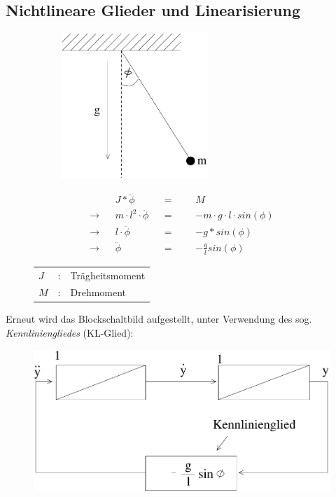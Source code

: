 \message{ !name(Mitschrieb_SysRegel.tex)}\documentclass[12pt,a4paper,ngerman]{scrartcl}
\begin{document}
\subsection{Nichtlineare Glieder und Linearisierung}

\begin{figure}[H]
  \begin{minipage}{.4\linewidth} %
\begin{figure}[H]
\includegraphics[height=5.5cm]{sysregel_bsp_6} %
\end{figure}
 \end{minipage}%
  \begin{minipage}{.6\linewidth} %
   \begin{align*}
    &&J*\ddot{\phi}&&=&&&M\\
\rightarrow&& m\cdot l^2 \cdot \ddot{\phi} &&=&&& -m\cdot g \cdot l \cdot sin(\phi)\\
\rightarrow&& l \cdot \ddot{\phi}&&=&&&-g*sin(\phi)\\
\rightarrow&& \ddot{\phi}&&=&&& -\frac{g}{l}sin(\phi)
   \end{align*}
   \begin{tabular}{lll}
$J$&:& Trägheitsmoment\\
$M$&:& Drehmoment
  
   \end{tabular}

\end{minipage}%
\end{figure}

Erneut wird das Blockschaltbild aufgestellt, unter Verwendung des sog. \emph{Kennliniengliedes} (KL-Glied):

\begin{figure}[H]
  \centering
  \includegraphics[width=.5\linewidth]{sysregel_bsb4}
\end{figure}
\end{document}
